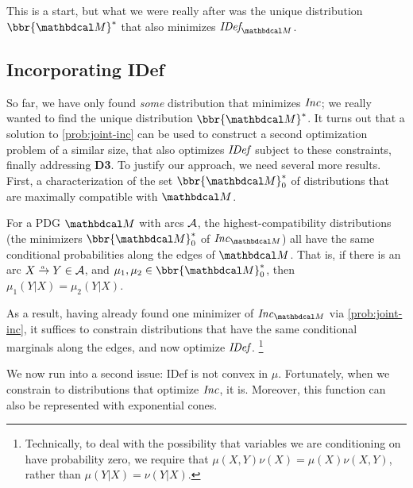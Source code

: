\documentclass[twoside]{article}
\begin{document}
This is a start, but what we were really after was the unique distribution
$\bbr{\dg M}^*$ that also minimizes $\IDef{\dg M}$.

\subsection{Incorporating IDef}
    \label{sec:also-idef}
So far, we have only found \emph{some} distribution that minimizes $\mathit{Inc}$; 
we really wanted to find the unique distribution $\bbr{\dg M}^*$.
It turns out that a solution to \eqref{prob:joint-inc} can be used to construct a second optimization problem of a similar size, that also optimizes $\mathit{IDef}_{\!}$ subject to these constraints, finally addressing \textbf{D3}. 
To justify our approach, we need several more results.
First, a characterization of the set $\bbr{\dg M}^*_0$ of distributions that are maximally compatible with $\dg M$. 

\begin{prop}\label{prop:marginonly}
    For a PDG $\dg M$ with arcs $\cal A$,
	the highest-compatibility distributions (the minimizers $\bbr{\dg M}_0^*$ of $\Inc_{\dg M}$) all have the same conditional probabilities along the edges of $\dg M$.   
	That is, if there is an arc $\ed aXY \in \Ar$, and $\mu_1, \mu_2 \in \bbr{\dg M}_0^*$,
    then $\mu_1(Y|X) = \mu_2(Y|X)$.  
\end{prop}

As a result, having already found one minimizer of $\Inc_{\dg M}$ via \eqref{prob:joint-inc}, it suffices to constrain distributions that have the same conditional marginals along the edges, and now optimize $\mathit{IDef}_{\!}$.%
    \footnote{
        Technically, to deal with the possibility that variables we
        are conditioning on have probability zero,  
        we require that $\mu(X,Y)\nu(X) = \mu(X) \nu(X,Y)$, rather than 
        $\mu(Y|X) = \nu(Y|X)$.
    }

We now run into a second issue: IDef is not convex in $\mu$. 
Fortunately, when we constrain to distributions that optimize $\mathit{Inc}$, 
it is.
Moreover, this function can also be represented with exponential cones.
\end{document}
